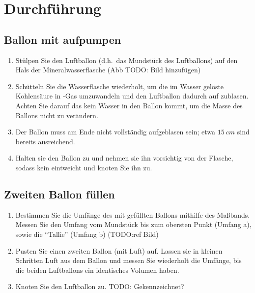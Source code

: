 \documentclass{article}
\begin{document}
    \section{Durchführung}
        \subsection{Ballon mit \texorpdfstring{}{CO2} aufpumpen}
            \begin{enumerate}
                \item Stülpen Sie den Luftballon (d.h.\ das Mundstück des Luftballons) auf den Hals der Mineralwasserflasche (Abb TODO: Bild hinzufügen)
                \item Schütteln Sie die Wasserflasche wiederholt, um die im Wasser gelöste Kohlensäure in -Gas umzuwandeln und den Luftballon dadurch auf zublasen.
                Achten Sie darauf das kein Wasser in den Ballon kommt, um die Masse des Ballons nicht zu verändern.
                \item Der Ballon muss am Ende nicht vollständig aufgeblasen sein; etwa \(\SI{15}{cm}\) sind bereits ausreichend.
                \item Halten sie den Ballon zu und nehmen sie ihn vorsichtig von der Flasche, sodass kein  eintweicht und knoten Sie ihn zu.
            \end{enumerate}
        
        \subsection{Zweiten Ballon füllen}
            \begin{enumerate}[resume]
                \item Bestimmen Sie die Umfänge des mit  gefüllten Ballons mithilfe des Maßbands.
                Messen Sie den Umfang vom Mundstück bis zum obersten Punkt (Umfang a), sowie die \enquote{Tallie} (Umfang b) (TODO:ref Bild)
                \item Pusten Sie einen zweiten Ballon (mit Luft) auf. Lassen sie in kleinen Schritten Luft aus dem Ballon und messen Sie wiederholt die Umfänge,
                bis die beiden Luftballons ein identisches Volumen haben.
                \item Knoten Sie den Luftballon zu.
                TODO: Gekennzeichnet?
            \end{enumerate}
        
\end{document}
